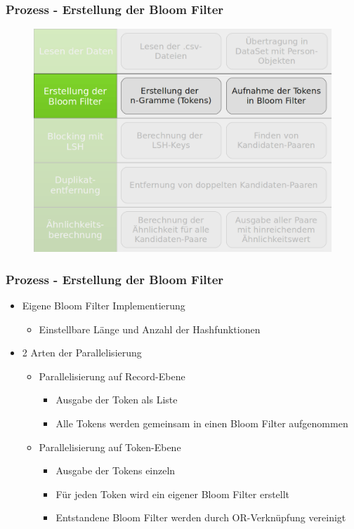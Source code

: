 \documentclass{beamer}
\begin{document}
    \begin{frame}
    		\frametitle{Prozess - Erstellung der Bloom Filter}
    		\begin{figure}[H]
    			\includegraphics[width=\textwidth]{graphics/process_2.png}
    		\end{figure}
    \end{frame}
    
    \begin{frame}
    		\frametitle{Prozess - Erstellung der Bloom Filter}
    		\begin{itemize}
    			\item Eigene Bloom Filter Implementierung
    			\begin{itemize}
    				\item Einstellbare Länge und Anzahl der Hashfunktionen
    			\end{itemize}
    			\item 2 Arten der Parallelisierung
    			\begin{itemize}
    				\item Parallelisierung auf Record-Ebene
    				\begin{itemize}
    					\item Ausgabe der Token als Liste
    					\item Alle Tokens werden gemeinsam in einen Bloom Filter aufgenommen
    				\end{itemize}
    				\item Parallelisierung auf Token-Ebene
    				\begin{itemize}
    					\item Ausgabe der Tokens einzeln
    					\item Für jeden Token wird ein eigener Bloom Filter erstellt
    					\item Entstandene Bloom Filter werden durch OR-Verknüpfung vereinigt
    				\end{itemize}
    			\end{itemize}
    		\end{itemize}
    \end{frame}
    
\end{document}
